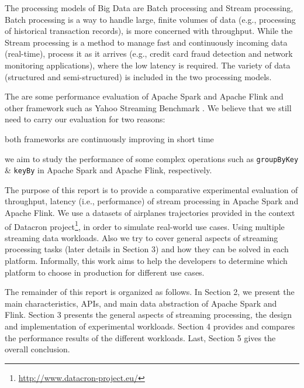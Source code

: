 \documentclass[]{article}
\begin{document}
\par The processing models of Big Data are Batch processing and Stream processing, Batch processing is a way to handle large, finite volumes of data (e.g., processing of historical transaction records), is more concerned with throughput. While the Stream processing  is a method to manage fast and continuously incoming data (real-time), process it as it arrives (e.g., credit card fraud detection and network monitoring applications), where the low latency is required. The variety of data (structured and semi-structured) is included in the two processing models.

\par The are some performance evaluation of Apache Spark and Apache Flink and other framework such as Yahoo Streaming Benchmark \cite{yahoo}. We believe that we still need to carry our evaluation for two reasons: \begin{enumerate*}[label=(\roman*)]
\item both frameworks are continuously improving in short time 
\item we aim to study the performance of some complex operations such as \texttt{groupByKey} \& \texttt{keyBy} in Apache Spark and Apache Flink, respectively.
\end{enumerate*}

 

\par The purpose of this report is to provide a comparative experimental evaluation of throughput, latency (i.e., performance) of stream processing in Apache Spark and Apache Flink. We use a datasets of airplanes trajectories provided in the context of Datacron project\footnote{\url{http://www.datacron-project.eu/}}, in order to simulate real-world use cases. Using multiple streaming data workloads. Also we try to cover general aspects of streaming processing tasks (later details in Section 3) and how they can be solved in each platform. Informally,  this work aims to help the developers to determine which platform to choose in production for different use cases. 


\par The remainder of this report is organized as follows.
In Section 2, we present the main characteristics, APIs, and main data abstraction of Apache Spark and Flink. Section 3  presents the general aspects of streaming processing, the design and implementation of experimental workloads. Section 4
provides and compares the performance results of the different workloads. Last, Section 5 gives the overall conclusion.
\end{document}

